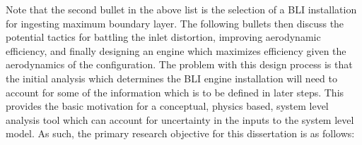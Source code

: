 Note that the second bullet in the above list is the selection of a BLI installation for ingesting maximum boundary layer.  The following bullets then discuss the potential tactics for battling the inlet distortion, improving aerodynamic efficiency, and finally designing an engine which maximizes efficiency given the aerodynamics of the configuration.  The problem with this design process is that the initial analysis which determines the BLI engine installation will need to account for some of the information which is to be defined in later steps.  This provides the basic motivation for a conceptual, physics based, system level analysis tool which can account for uncertainty in the inputs to the system level model.  As such, the primary research objective for this dissertation is as follows:

\vspace{25pt}

